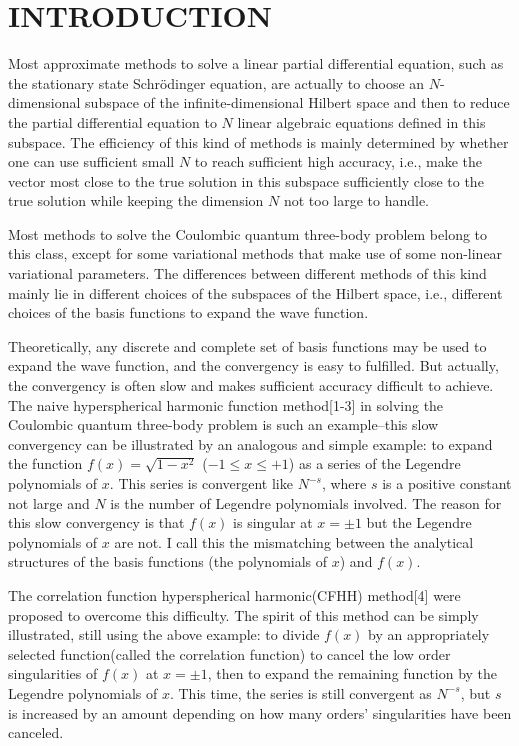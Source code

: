 \vspace{5mm}

\section{INTRODUCTION}

Most approximate methods to solve a linear partial differential
equation, such as the stationary state Schr\"{o}dinger equation,
are actually to choose an
$N$-dimensional subspace of the infinite-dimensional Hilbert space and
then to reduce the partial differential equation to $N$ linear algebraic
equations defined in this subspace. The efficiency of this kind of methods
is mainly determined by whether one can use sufficient small $N$ to reach
sufficient high accuracy, i.e., make the vector most close
to the true solution in this subspace sufficiently close to the true
solution while keeping the dimension $N$ not too large to handle.

Most methods to solve the Coulombic quantum three-body problem belong to
this class, except for some variational methods that make use of some
non-linear
variational parameters. The differences between different methods of this kind
mainly lie in different choices of the subspaces of the Hilbert space,
i.e., different choices of
the basis functions to expand the wave function.

Theoretically, any discrete
and complete set of basis functions may be used to expand the wave function,
and the convergency is easy to fulfilled. But actually, the convergency is
often slow and makes sufficient accuracy difficult to achieve. The naive
hyperspherical harmonic function method[1-3] in solving the Coulombic quantum
three-body problem is such an example--this slow convergency can be illustrated
by an analogous and simple example: to expand the function $f(x)=\sqrt{1-x^2}$
($-1\le x\le +1$) as a series of the Legendre polynomials of $x$. This series
is convergent like $N^{-s}$, where $s$ is a positive constant not large and $N$ is
the number of Legendre polynomials involved. The reason for this slow
convergency is that $f(x)$ is singular at $x=\pm 1$ but the Legendre
polynomials of $x$ are not. I call this the mismatching between the analytical
structures of the basis functions (the polynomials of $x$) and $f(x)$.

The correlation function hyperspherical harmonic(CFHH) method[4] were proposed to
overcome this difficulty. The spirit of this method can be simply illustrated,
still using the above example: to divide $f(x)$ by an appropriately selected
function(called the correlation function) to cancel the low order singularities
of $f(x)$ at $x=\pm 1$, then to expand the remaining function by the
Legendre polynomials of $x$. This time, the series is still convergent as
$N^{-s}$, but $s$ is increased by an amount depending on how many orders'
singularities have been canceled.

